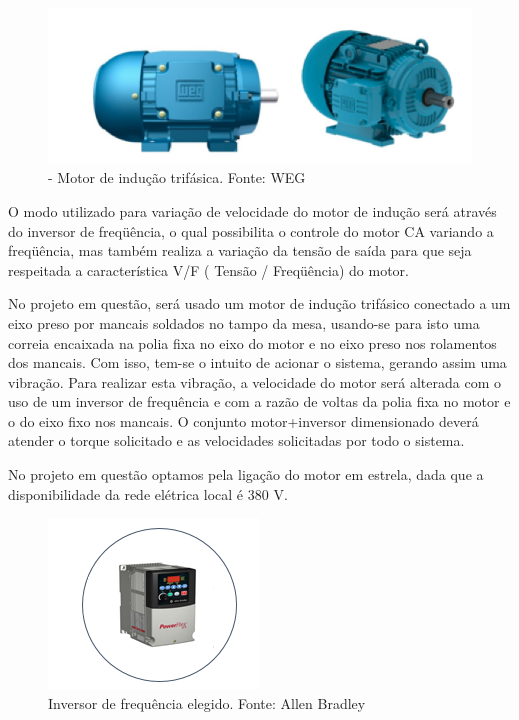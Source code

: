 \begin{figure}[H]
    \centering
        \includegraphics[keepaspectratio=true,scale=0.6]{figuras/2.png}
    \caption{- Motor de indução trifásica. Fonte: WEG}
    \label{motor}
\end{figure}

O modo utilizado para variação de velocidade do motor de indução será através do inversor de freqüência, o qual possibilita o controle do motor CA variando a freqüência, mas também realiza a variação da tensão de saída para que seja respeitada a característica V/F ( Tensão / Freqüência) do motor.

No projeto em questão, será usado um motor de indução trifásico conectado a um eixo preso por mancais soldados no tampo da mesa, usando-se para isto uma correia encaixada na polia fixa no eixo do motor e no eixo preso nos rolamentos dos mancais. Com isso, tem-se o intuito de acionar o sistema, gerando assim uma vibração. Para realizar esta vibração, a velocidade do motor será alterada com o uso de um inversor de frequência e com a razão de voltas da polia fixa no motor e o do eixo fixo nos mancais. O conjunto motor+inversor dimensionado deverá atender o torque solicitado e as velocidades solicitadas por todo o sistema.

No projeto em questão optamos pela ligação do motor em estrela, dada que a disponibilidade da rede elétrica local é 380 V.

\begin{figure}[H]
    \centering
        \includegraphics[keepaspectratio=true,scale=1.0]{figuras/3.png}
    \caption{Inversor de frequência elegido. Fonte: Allen Bradley}
    \label{inversor}
\end{figure}


